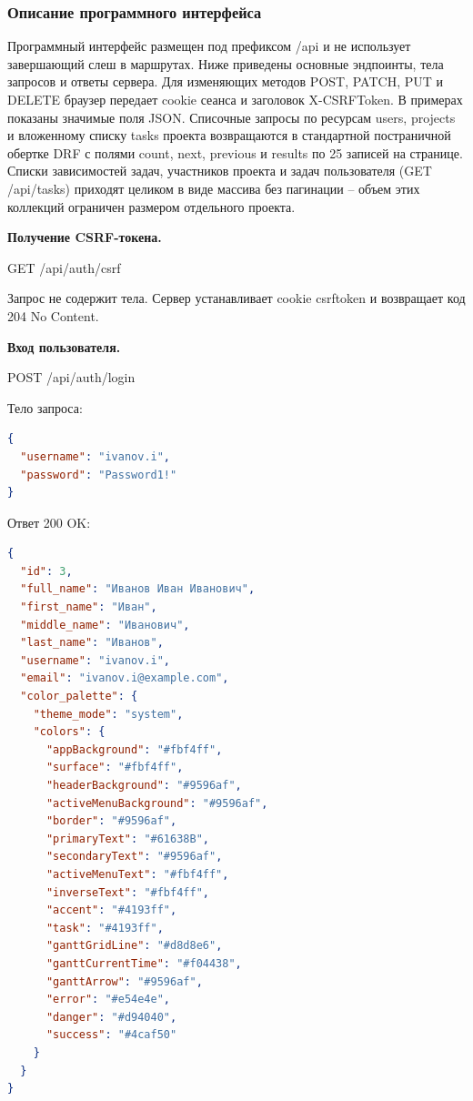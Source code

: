 \subsubsection{Описание программного интерфейса}

Программный интерфейс размещен под префиксом /api и не использует завершающий слеш в маршрутах. Ниже приведены основные эндпоинты, тела запросов и ответы сервера. Для изменяющих методов POST, PATCH, PUT и DELETE браузер передает cookie сеанса и заголовок X-CSRFToken. В примерах показаны значимые поля JSON. Списочные запросы по ресурсам users, projects и вложенному списку tasks проекта возвращаются в стандартной постраничной обертке DRF с полями count, next, previous и results по 25 записей на странице. Списки зависимостей задач, участников проекта и задач пользователя (GET /api/tasks) приходят целиком в виде массива без пагинации -- объем этих коллекций ограничен размером отдельного проекта.

\textbf{Получение CSRF-токена.}

GET /api/auth/csrf

Запрос не содержит тела. Сервер устанавливает cookie csrftoken и возвращает код 204 No Content.

\textbf{Вход пользователя.}

POST /api/auth/login

Тело запроса:

\begin{lstlisting}[numbers=none, language=json]
{
  "username": "ivanov.i",
  "password": "Password1!"
}
\end{lstlisting}


Ответ 200 OK:

\begin{lstlisting}[numbers=none, language=json]
{
  "id": 3,
  "full_name": "Иванов Иван Иванович",
  "first_name": "Иван",
  "middle_name": "Иванович",
  "last_name": "Иванов",
  "username": "ivanov.i",
  "email": "ivanov.i@example.com",
  "color_palette": {
    "theme_mode": "system",
    "colors": {
      "appBackground": "#fbf4ff",
      "surface": "#fbf4ff",
      "headerBackground": "#9596af",
      "activeMenuBackground": "#9596af",
      "border": "#9596af",
      "primaryText": "#61638B",
      "secondaryText": "#9596af",
      "activeMenuText": "#fbf4ff",
      "inverseText": "#fbf4ff",
      "accent": "#4193ff",
      "task": "#4193ff",
      "ganttGridLine": "#d8d8e6",
      "ganttCurrentTime": "#f04438",
      "ganttArrow": "#9596af",
      "error": "#e54e4e",
      "danger": "#d94040",
      "success": "#4caf50"
    }
  }
}
\end{lstlisting}



